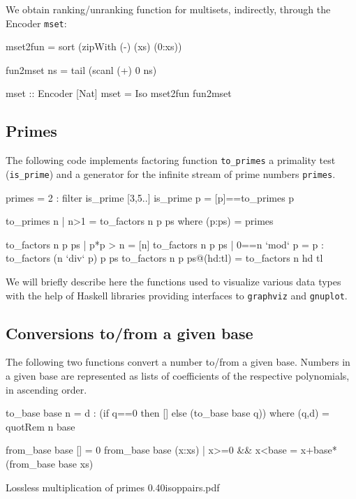\documentclass[]{INCLUDES/llncs}
\begin{document}
We obtain ranking/unranking function for multisets, indirectly, through the
Encoder {\tt mset}:
\begin{code}
mset2fun = sort (zipWith (-) (xs) (0:xs))

fun2mset ns = tail (scanl (+) 0 ns) 

mset :: Encoder [Nat]
mset = Iso mset2fun fun2mset
\end{code}

\subsection*{Primes}
The following code implements factoring function {\tt to\_primes} a primality
test ({\tt is\_prime}) and a generator for the infinite stream of prime numbers
{\tt primes}.

\begin{code}
primes = 2 : filter is_prime [3,5..]
is_prime p = [p]==to_primes p

to_primes n | n>1 = to_factors n p ps where 
  (p:ps) = primes

to_factors n p ps | p*p > n = [n]
to_factors n p ps | 0==n `mod` p = p : to_factors (n `div` p)  p ps 
to_factors n p ps@(hd:tl) = to_factors n hd tl
\end{code}

We will briefly describe here the functions used to visualize various data
types with the help of Haskell libraries providing interfaces to {\tt graphviz}
and {\tt gnuplot}.

\subsection*{Conversions to/from a given base}
The following two functions convert a number to/from a given base. Numbers in a
given base are represented as lists of coefficients of the respective
polynomials, in ascending order.
\begin{code}
to_base base n = d : (if q==0 then [] else (to_base base q)) where
   (q,d) = quotRem n base

from_base base [] = 0
from_base base (x:xs) | x>=0 && x<base = x+base*(from_base base xs)
\end{code}

{Lossless multiplication of primes}
{0.40}{isoppairs.pdf}
\end{document}
